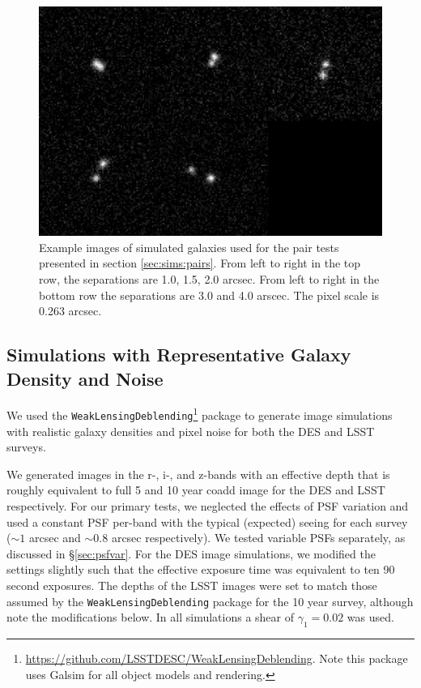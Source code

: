 \documentclass[iop, twocolappendix, appendixfloats, numberedappendix, apj]{hackemulateapj}
\begin{document}
\begin{figure}
    \begin{center}
        \includegraphics[width=\textwidth]{figures/bdk-comb.png}
        \caption{Example images of simulated galaxies used for the pair tests
        presented in section \ref{sec:sims:pairs}.  From left to right in the top row,
        the separations are 1.0, 1.5, 2.0 arcsec. From left to right in the bottom row the
        separations are 3.0 and 4.0 arscec. The pixel scale is 0.263 arcsec.
        \label{fig:pairs}}
    \end{center}
\end{figure}

\subsection{Simulations with Representative Galaxy Density and Noise}
\label{sec:sims:realgals}

We used the
\texttt{WeakLensingDeblending}\footnote{\url{https://github.com/LSSTDESC/WeakLensingDeblending}.
Note this package uses Galsim for all object models and rendering.} package to
generate image simulations with realistic galaxy densities and pixel noise for
both the DES and LSST surveys.

We generated images in the r-, i-, and z-bands with an effective depth that is
roughly equivalent to full 5 and 10 year coadd image for the DES and LSST
respectively. For our primary tests, we neglected the effects of PSF variation
and used a constant PSF per-band with the typical (expected) seeing for each
survey ($\sim\!1$ arcsec and $\sim\!0.8$ arcsec respectively). We tested
variable PSFs separately, as discussed in \S \ref{sec:psfvar}.  For the DES
image simulations, we modified the settings slightly such that the effective
exposure time was equivalent to ten 90 second exposures. The depths of the LSST
images were set to match those assumed by the \texttt{WeakLensingDeblending}
package for the 10 year survey, although note the modifications below. In all
simulations a shear of $\gamma_1 = 0.02$ was used.
\end{document}
